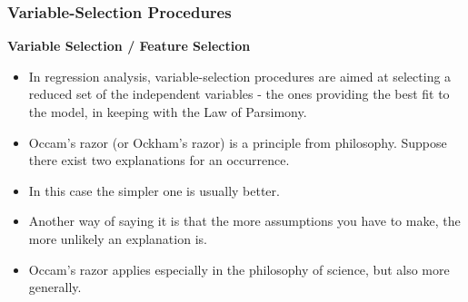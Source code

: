 \documentclass[PredictiveAnalytics101.tex]{subfiles}
\begin{document}
\begin{frame}
	\frametitle{Variable-Selection Procedures}
	\textbf{ Variable Selection / Feature Selection}\\
	\begin{itemize}
		\item In regression analysis, variable-selection procedures are aimed at selecting a reduced set of the independent variables - the ones providing the best fit to the model, in keeping with the Law of Parsimony.
	\end{itemize}
	
\end{frame}
\begin{frame}
\begin{itemize}
\item Occam's razor (or Ockham's razor) is a principle from philosophy. Suppose there exist two explanations for an occurrence. \item In this case the simpler one is usually better. 
\item Another way of saying it is that the more assumptions you have to make, the more unlikely an explanation is. 
\item Occam's razor applies especially in the philosophy of science, but also more generally.
\end{itemize}
\end{frame}
\end{document}
